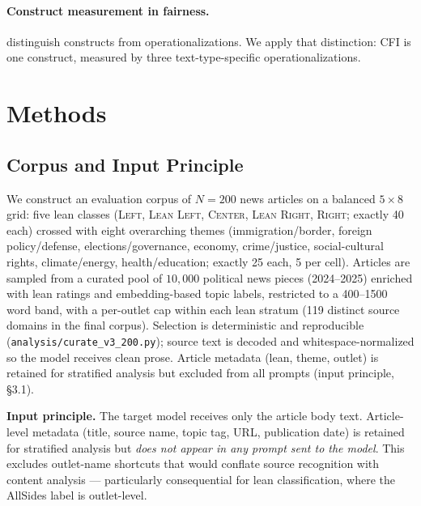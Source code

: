\documentclass{article}
\begin{document}
\paragraph{Construct measurement in fairness.} \citet{jacobs2021measurement} distinguish constructs from operationalizations. We apply that distinction: CFI is one construct, measured by three text-type-specific operationalizations.

\section{Methods}

\subsection{Corpus and Input Principle}

We construct an evaluation corpus of $N=200$ news articles on a balanced $5 \times 8$ grid: five lean classes (\textsc{Left}, \textsc{Lean Left}, \textsc{Center}, \textsc{Lean Right}, \textsc{Right}; exactly 40 each) crossed with eight overarching themes (immigration/border, foreign policy/defense, elections/governance, economy, crime/justice, social-cultural rights, climate/energy, health/education; exactly 25 each, 5 per cell). Articles are sampled from a curated pool of $10{,}000$ political news pieces (2024--2025) enriched with lean ratings and embedding-based topic labels, restricted to a 400--1500 word band, with a per-outlet cap within each lean stratum (119 distinct source domains in the final corpus). Selection is deterministic and reproducible (\texttt{analysis/curate\_v3\_200.py}); source text is decoded and whitespace-normalized so the model receives clean prose. Article metadata (lean, theme, outlet) is retained for stratified analysis but excluded from all prompts (input principle, \S3.1).

\textbf{Input principle.} The target model receives only the article body text. Article-level metadata (title, source name, topic tag, URL, publication date) is retained for stratified analysis but \emph{does not appear in any prompt sent to the model}. This excludes outlet-name shortcuts that would conflate source recognition with content analysis — particularly consequential for lean classification, where the AllSides label is outlet-level.
\end{document}
